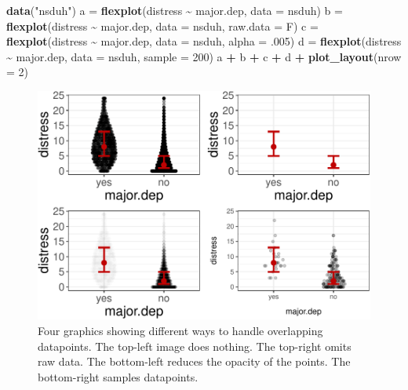 \documentclass[
  man]{apa6}
\newenvironment{Shaded}{\begin{snugshade}}{\end{snugshade}}
\newcommand{\DataTypeTok}[1]{\textcolor[rgb]{0.13,0.29,0.53}{#1}}
\newcommand{\DecValTok}[1]{\textcolor[rgb]{0.00,0.00,0.81}{#1}}
\newcommand{\FloatTok}[1]{\textcolor[rgb]{0.00,0.00,0.81}{#1}}
\newcommand{\KeywordTok}[1]{\textcolor[rgb]{0.13,0.29,0.53}{\textbf{#1}}}
\newcommand{\NormalTok}[1]{#1}
\newcommand{\OperatorTok}[1]{\textcolor[rgb]{0.81,0.36,0.00}{\textbf{#1}}}
\newcommand{\StringTok}[1]{\textcolor[rgb]{0.31,0.60,0.02}{#1}}
\begin{document}
\small

\begin{Shaded}
\begin{Highlighting}[]
\KeywordTok{data}\NormalTok{(}\StringTok{"nsduh"}\NormalTok{)}
\NormalTok{a =}\StringTok{ }\KeywordTok{flexplot}\NormalTok{(distress }\OperatorTok{\textasciitilde{}}\StringTok{ }\NormalTok{major.dep, }\DataTypeTok{data =}\NormalTok{ nsduh)}
\NormalTok{b =}\StringTok{ }\KeywordTok{flexplot}\NormalTok{(distress }\OperatorTok{\textasciitilde{}}\StringTok{ }\NormalTok{major.dep, }\DataTypeTok{data =}\NormalTok{ nsduh, }\DataTypeTok{raw.data =}\NormalTok{ F)}
\NormalTok{c =}\StringTok{ }\KeywordTok{flexplot}\NormalTok{(distress }\OperatorTok{\textasciitilde{}}\StringTok{ }\NormalTok{major.dep, }\DataTypeTok{data =}\NormalTok{ nsduh, }\DataTypeTok{alpha =} \FloatTok{.005}\NormalTok{)}
\NormalTok{d =}\StringTok{ }\KeywordTok{flexplot}\NormalTok{(distress }\OperatorTok{\textasciitilde{}}\StringTok{ }\NormalTok{major.dep, }\DataTypeTok{data =}\NormalTok{ nsduh, }\DataTypeTok{sample =} \DecValTok{200}\NormalTok{)}
\NormalTok{a }\OperatorTok{+}\StringTok{ }\NormalTok{b }\OperatorTok{+}\StringTok{ }\NormalTok{c }\OperatorTok{+}\StringTok{ }\NormalTok{d }\OperatorTok{+}\StringTok{ }\KeywordTok{plot\_layout}\NormalTok{(}\DataTypeTok{nrow =} \DecValTok{2}\NormalTok{)}
\end{Highlighting}
\end{Shaded}

\begin{figure}
\centering
\includegraphics{flexplot_psychmeth_files/figure-latex/sample-1.pdf}
\caption{\label{fig:sample}Four graphics showing different ways to handle overlapping datapoints. The top-left image does nothing. The top-right omits raw data. The bottom-left reduces the opacity of the points. The bottom-right samples datapoints. \label{fig:sample}}
\end{figure}
\end{document}
